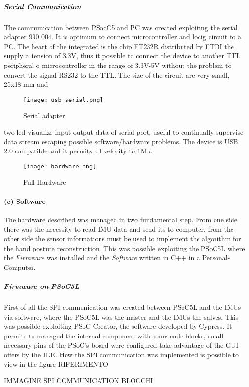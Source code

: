 \subparagraph{Serial Communication}

The communication between PSocC5 and PC was created exploiting the serial adapter 990 004. It is optimum to connect microcontroller and locig circuit to a PC. The heart of the integrated is the chip FT232R distributed by FTDI the supply a tension of 3.3V, thus it possible to connect the device to another TTL peripheral o microcontroller in the range of 3.3V-5V without the problem to convert the signal RS232 to  the TTL. The size of the circuit are very small, 25x18 mm and
\begin{figure}[h]
\centering
\texttt{[image: usb\_serial.png]}
\caption{Serial adapter}
\label{fig:serial_adapter}
\end{figure}
two led visualize  input-output data of serial port, useful to continually supervise data stream escaping possible software/hardware problems. The device is USB 2.0 compatible and it permits all velocity to 1Mb. 

\begin{figure}[h]
\centering
\texttt{[image: hardware.png]}
\caption{Full Hardware}
\label{fig:hardware}
\end{figure}


\paragraph{(c) Software}

The hardware described was managed in two fundamental step.  From one side there was the necessity to read IMU data and send its to computer, from the other side the sensor informations must be used to implement the algorithm for the  hand posture reconstruction.  
This was possible exploiting the PSoC5L where the \textit{Firmware} was installed and the \textit{Software} written in C++ in a Personal-Computer.


\subparagraph{Firmware on PSoC5L}

\noindent First of all the SPI communication was created between PSoC5L and the IMUs via software, where the PSoC5L  was the master and the IMUs the salves.  This was possible exploiting PSoC Creator, the software developed by Cypress. It permits to managed the internal component with some code blocks, so all necessary pins of the PSoC's board were configured take advantage of the GUI offers by the IDE.   How the SPI communication was implemented is possible to view in the figure RIFERIMENTO

IMMAGINE SPI COMMUNICATION BLOCCHI


